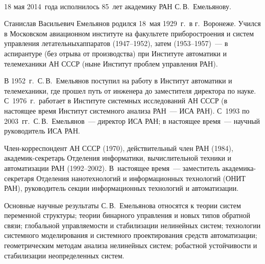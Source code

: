 


\vspace*{10mm}


          \begin{multicols}{2}


            \begin{center}
\mbox{%
\epsfxsize=57.143mm
}
\end{center}

\vspace*{18pt}



  18 мая 2014~года исполнилось 85~лет академику РАН С.\,В.~Емельянову.

     Станислав Васильевич Емельянов родился 18~мая 1929~г.\ в г.~Воронеже. Учился в Московском авиационном
институте на факультете приборостроения и систем управления летательных\linebreak аппаратов (1947--1952), затем
(1953--1957)~--- в аспирантуре (без отрыва от производства) при Институте автоматики и телемеханики АН СССР (ныне
Институт проблем управления РАН).

     В 1952~г.\ С.\,В.~Емельянов поступил на работу в Институт автоматики и телемеханики, где прошел путь от
инженера до заместителя директора по науке. С~1976~г.\ работает в Институте системных исследований АН СССР (в
настоящее время Институт системного анализа РАН~--- ИСА РАН). С~1993 по 2003~гг.\ С.\,В.~Емельянов~--- директор
ИСА РАН; в настоящее время~--- научный руководитель ИСА РАН.

     Член-корреспондент АН СССР (1970), действительный член РАН (1984), ака\-де\-мик-сек\-ре\-тарь Отделения
информатики, вычислительной техники и автоматизации РАН (1992--2002). В~настоящее время~---
заместитель
ака\-де\-ми\-ка-сек\-ре\-та\-ря Отделения нанотехнологий и информационных технологий (ОНИТ РАН), руководитель
секции информационных технологий и автоматизации.

     Основные научные результаты С.\,В.~Емельянова относятся к теории систем переменной структуры; теории
бинарного управления и новых типов обратной связи; глобальной управляемости и стабилизации нелинейных систем;
технологии системного моделирования и системного проектирования средств автоматизации; геометрическим методам
анализа нелинейных систем; робастной устой\-чи\-вости и стабилизации неопределенных систем.


\end{multicols}
